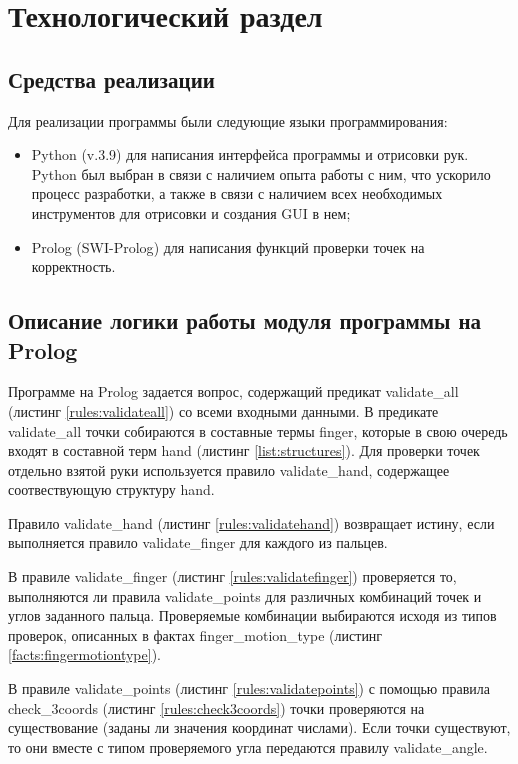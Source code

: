 \chapter{Технологический раздел}


\section{Средства реализации}
\hspace{0.6cm} Для реализации программы были следующие языки программирования:
\begin{itemize}
	\item Python (v.3.9\cite{web:python}) для написания интерфейса программы и отрисовки рук. Python был выбран в связи с наличием опыта работы с ним, что ускорило процесс разработки, а также в связи с наличием всех необходимых инструментов для отрисовки и создания GUI в нем;
	\item Prolog (SWI-Prolog\cite{web:prolog}) для написания функций проверки точек на корректность.
\end{itemize}

\section{Описание логики работы модуля программы на Prolog}

\hspace{0.6cm} Программе на Prolog задается вопрос, содержащий предикат validate\_all (листинг \ref{rules:validateall}) со всеми входными данными. В предикате validate\_all точки собираются в составные термы finger, которые в свою очередь входят в составной терм hand (листинг \ref{list:structures}). Для проверки точек отдельно взятой руки используется правило validate\_hand, содержащее соотвествующую структуру hand.

\hspace{0.6cm} Правило validate\_hand (листинг \ref{rules:validatehand}) возвращает истину, если выполняется правило validate\_finger для каждого из пальцев.

\hspace{0.6cm} В правиле validate\_finger (листинг \ref{rules:validatefinger}) проверяется то, выполняются ли правила validate\_points для различных комбинаций точек и углов заданного пальца. Проверяемые комбинации выбираются исходя из типов проверок, описанных в фактах finger\_motion\_type (листинг \ref{facts:fingermotiontype}).

\hspace{0.6cm} В правиле validate\_points (листинг \ref{rules:validatepoints}) с помощью правила check\_3coords (листинг \ref{rules:check3coords}) точки проверяются на существование (заданы ли значения координат числами). Если точки существуют, то они вместе с типом проверяемого угла передаются правилу validate\_angle.

